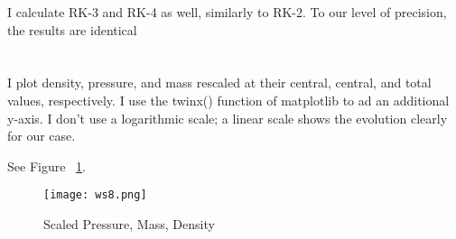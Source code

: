 \documentclass[11pt,letterpaper]{article}
\begin{document}
I calculate RK-3 and RK-4 as well, similarly to RK-2. To our level of precision, the results are identical

\section{}
I plot density, pressure, and mass rescaled at their central, central, and total values, respectively. I use the twinx() function of matplotlib to ad an additional y-axis. I don't use a logarithmic scale; a linear scale shows the evolution clearly for our case.

See Figure ~\ref{fig:1}.

\begin{figure}[bth]
\centering
\texttt{[image: ws8.png]}
\caption{Scaled Pressure, Mass, Density}
\label{fig:1}
\end{figure}
\end{document}
